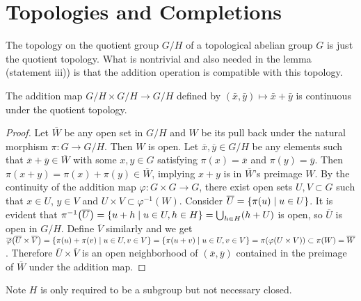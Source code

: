 \documentclass{note}
\begin{document}
\section*{Topologies and Completions}



The topology on the quotient group $G/H$ of a topological abelian group $G$ is just
the quotient topology. What is nontrivial and also needed in the lemma (statement
iii)) is that the addition operation is compatible with this topology.

\begin{lemma*}
  The addition map $G/H \times G/H \to G/H$ defined by $(\bar{x},\bar{y}) \mapsto
  \bar{x}+\bar{y}$ is continuous under the quotient topology.
\end{lemma*}

\begin{proof}
  Let $\overline{W}$ be any open set in $G/H$ and $W$ be its pull back under the
  natural morphism $\pi\colon G \to G/H$. Then $W$ is open. Let $\overline{x},
  \overline{y} \in G/H$ be any elements such that $\overline{x} + \overline{y} \in
  \overline{W}$ with some $x, y \in G$ satisfying $\pi(x) = \overline{x}$ and
  $\pi(y) = \overline{y}$. Then $\pi(x + y) = \pi(x) + \pi(y) \in \overline{W}$,
  implying $x + y$ is in $\overline{W}$'s preimage $W$. By the continuity of the
  addition map $\varphi\colon G \times G \to G$, there exist open sets $U,V \subset
  G$ such that $x\in U$, $y\in V$ and $U\times V \subset \varphi^{-1}(W)$. Consider
  $\overline{U} = \setbuilder{\pi(u)}{u \in U}$. It is evident that
  $\pi^{-1}\left(\overline{U}\right) = \setbuilder{u+h}{u \in U, h \in H} =
  \bigcup_{h\in H}(h+U)$ is open, so $\overline{U}$ is open in $G/H$. Define
  $\overline{V}$ similarly and we get
  $\overline\varphi\left(\overline{U}\times\overline{V}\right) =
  \setbuilder{\pi(u)+\pi(v)}{u\in U, v\in V} = \setbuilder{\pi(u+v)}{u\in U, v\in V}
  = \pi\left(\varphi\left(U\times V\right)\right) \subset \pi(W) = \overline{W}$.
  Therefore $\overline{U} \times \overline{V}$ is an open neighborhood of
  $\left(\overline{x}, \overline{y}\right)$ contained in the preimage of
  $\overline{W}$ under the addition map.
\end{proof}

\begin{remark*}
  Note $H$ is only required to be a subgroup but not necessary closed.
\end{remark*}
\end{document}
